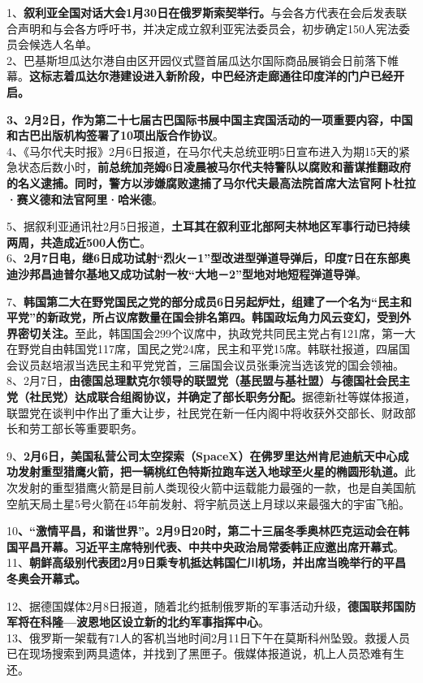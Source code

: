 1、{\textbf{叙利亚全国对话大会1月30日在俄罗斯索契举行。}}与会各方代表在会后发表联合声明和与会各方呼吁书，并决定成立叙利亚宪法委员会，初步确定150人宪法委员会候选人名单。\\
2、巴基斯坦瓜达尔港自由区开园仪式暨首届瓜达尔国际商品展销会日前落下帷幕。{\textbf{这标志着瓜达尔港建设进入新阶段，中巴经济走廊通往印度洋的门户已经开启。}}

{\textbf{3、2月2日，作为第二十七届古巴国际书展中国主宾国活动的一项重要内容，中国和古巴出版机构签署了10项出版合作协议}}。\\
4、《马尔代夫时报》2月6日报道，在马尔代夫总统亚明5日宣布进入为期15天的紧急状态后数小时，{\textbf{前总统加尧姆6日凌晨被马尔代夫特警队以腐败和蓄谋推翻政府的名义逮捕。同时，警方以涉嫌腐败逮捕了马尔代夫最高法院首席大法官阿卜杜拉·赛义德和法官阿里·哈米德}}。

5、据叙利亚通讯社2月5日报道，{\textbf{土耳其在叙利亚北部阿夫林地区军事行动已持续两周，共造成近500人伤亡}}。\\
6、{\textbf{2月7日电，继6日成功试射``烈火－1''型改进型弹道导弹后，印度7日在东部奥迪沙邦昌迪普尔基地又成功试射一枚``大地－2''型地对地短程弹道导弹}}。

7、\textbf{{韩国第二大在野党国民之党的部分成员6日另起炉灶，组建了一个名为``民主和平党''的新政党，所占议席数量在国会排名第四。韩国政坛角力风云变幻，受到外界密切关注。}}至此，韩国国会299个议席中，执政党共同民主党占有121席，第一大在野党自由韩国党117席，国民之党24席，民主和平党15席。韩联社报道，四届国会议员赵培淑当选民主和平党党首，三届国会议员张秉浣当选该党的国会领袖。\\
8、2月7日，{\textbf{由德国总理默克尔领导的联盟党（基民盟与基社盟）与德国社会民主党（社民党）达成联合组阁协议，并确定了部长职务分配。}}据德新社等媒体报道，联盟党在谈判中作出了重大让步，社民党在新一任内阁中将收获外交部长、财政部长和劳工部长等重要职务。

9、{\textbf{2月6日，美国私营公司太空探索（SpaceX）在佛罗里达州肯尼迪航天中心成功发射重型猎鹰火箭，把一辆桃红色特斯拉跑车送入地球至火星的椭圆形轨道。}}此次发射的重型猎鹰火箭是目前人类现役火箭中运载能力最强的一款，也是自美国航空航天局土星5号火箭在45年前发射、将宇航员送上月球以来最强大的宇宙飞船。

10\textbf{、}{\textbf{``激情平昌，和谐世界''。2月9日20时，第二十三届冬季奥林匹克运动会在韩国平昌开幕。习近平主席特别代表、中共中央政治局常委韩正应邀出席开幕式}}。\\
11、{\textbf{朝鲜高级别代表团2月9日乘专机抵达韩国仁川机场，并出席当晚举行的平昌冬奥会开幕式。}}

12、据德国媒体2月8日报道，随着北约抵制俄罗斯的军事活动升级，{\textbf{德国联邦国防军将在科隆---波恩地区设立新的北约军事指挥中心}}。\\
13、俄罗斯一架载有71人的客机当地时间2月11日下午在莫斯科州坠毁。救援人员已在现场搜索到两具遗体，并找到了黑匣子。俄媒体报道说，机上人员恐难有生还。

